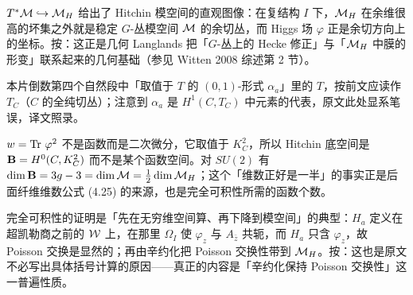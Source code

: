 \begin{yizhu}[物理图像]
$T^*{{\mathcal{M}}}\hookrightarrow{{{\mathcal{M}}}_H}$ 给出了 Hitchin 模空间的直观图像：在复结构 $I$ 下，${{{\mathcal{M}}}_H}$ 在余维很高的坏集之外就是稳定 $G$-丛模空间 ${{\mathcal{M}}}$ 的余切丛，而 Higgs 场 $\varphi$ 正是余切方向上的坐标。按：这正是几何 Langlands 把「$G$-丛上的 Hecke 修正」与「${{{\mathcal{M}}}_H}$ 中膜的形变」联系起来的几何基础（参见 Witten 2008 综述第 2 节）。
\end{yizhu}

\begin{yizhu}[原文疑误]
本片倒数第四个自然段中「取值于 $T$ 的 $(0,1)$-形式 $\alpha_a$」里的 $T$，按前文应读作 $T_C$（$C$ 的全纯切丛）；注意到 $\alpha_a$ 是 $H^1(C,T_C)$ 中元素的代表，原文此处显系笔误，译文照录。
\end{yizhu}

\begin{yizhu}[易错点]
$w=\operatorname{Tr}\,\varphi^2$ 不是函数而是二次微分，它取值于 $K_C^2$，所以 Hitchin 底空间是 ${{\mathbf{B}}}=H^0(C,K_C^2)$ 而不是某个函数空间。对 $SU(2)$ 有 $\dim {{\mathbf{B}}}=3g-3=\dim{{\mathcal{M}}}=\frac12\dim{{{\mathcal{M}}}_H}$；这个「维数正好是一半」的事实正是后面纤维维数公式 (4.25) 的来源，也是完全可积性所需的函数个数。
\end{yizhu}

\begin{yizhu}[含糊点拨]
完全可积性的证明是「先在无穷维空间算、再下降到模空间」的典型：$H_a$ 定义在超凯勒商之前的 ${\mathcal{W}}$ 上，在那里 $\Omega_I$ 使 $\varphi_z$ 与 $A_{\bar z}$ 共轭，而 $H_a$ 只含 $\varphi_z$，故 Poisson 交换是显然的；再由辛约化把 Poisson 交换性带到 ${{{\mathcal{M}}}_H}$。按：这也是原文不必写出具体括号计算的原因——真正的内容是「辛约化保持 Poisson 交换性」这一普遍性质。
\end{yizhu}
